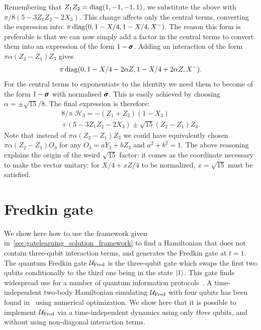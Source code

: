 Remembering that $Z_1 Z_2 = \operatorname{diag}(1, -1, -1, 1)$, we substitute the above with
$\pi/8(5 - 3Z_1 Z_2 - 2X_3)$.
This change affects only the central terms, converting the expression into:
$\pi \operatorname{diag}(0, 1 - X/4, 1 - X/4, X^-)$.
The reason this form is preferable is that we can now simply add a factor in the central terms to convert them into an expression of the form $1 - \pmb{\sigma}$.
Adding an interaction of the form $\pi \alpha (Z_2 - Z_1)Z_3$ gives
\begin{equation}
	\pi\operatorname{diag}(0, 1 - X/4 - 2\alpha Z, 1 - X/4 + 2\alpha Z, X^-).
\end{equation}
For the central terms to exponentiate to the identity we need them to become of the form $1-\pmb{\sigma}$ with normalised $\pmb{\sigma}$.
This is easily achieved by choosing $\alpha=\pm\sqrt{15}/8$.
The final expression is therefore:
\begin{equation}
\begin{aligned}
	8/\pi \,\, \mathcal H_3 = -(Z_1 + Z_2)(1 - X_3) \\+ (5 - 3Z_1Z_2 - 2 X_3)
				 \pm \sqrt{15} (Z_2 - Z_1)Z_3.
\end{aligned}
\end{equation}
Note that instead of $\pi \alpha (Z_2 - Z_1)Z_3$ we could have equivalently chosen
$\pi\alpha(Z_2-Z_1)O_3$ for any $O_3 = a Y_3 + b Z_3$ and $a^2 + b^2 = 1$.
The above reasoning explains the origin of the weird $\sqrt{15}$ factor: it comes as the coordinate necessary to make the vector unitary: for $X/4 + x Z / 4$ to be normalized, $x = \sqrt{15}$ must be satisfied.

\section{Fredkin gate}
We show here how to use the framework given in~\cref{sec:gatelearning_solution_framework} to find a Hamiltonian that does not contain three-qubit interaction terms, and generates the Fredkin gate at $t=1$.
The quantum Fredkin gate $\mathcal{U}_{\operatorname{Fred}}$ is the three-qubit gate which swaps the first two qubits conditionally to the third one being in the state $\ket1$.
This gate finds widespread use for a number of quantum information protocols~\cite{patel2016a,loft2018quantum}.
A time-independent two-body Hamiltonian simulating $\mathcal{U}_{\operatorname{Fred}}$ with four qubits has been found in~\cite{banchi2016quantum} using numerical optimization.
We show here that it is possible to implement $\mathcal{U}_{\operatorname{Fred}}$ via a time-independent dynamics using only \textit{three} qubits, and without using non-diagonal interaction terms.


